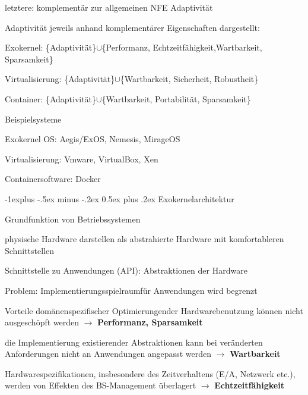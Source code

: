 \documentclass[a4paper]{article}
\makeatletter
\renewcommand{\subsection}{\@startsection{subsection}{2}{0mm}%
 {-1explus -.5ex minus -.2ex}%
 {0.5ex plus .2ex}%
 {\normalfont\normalsize\bfseries}}
\makeatother
\begin{document}
\begin{multicols}{3}
\begin{itemize*}
\begin{itemize*}
            \item letztere: komplementär zur allgemeinen NFE Adaptivität
        \end{itemize*}
        \item Adaptivität jeweils anhand komplementärer Eigenschaften dargestellt:
        \begin{itemize*}
            \item Exokernel: \{Adaptivität\}$\cup$\{Performanz, Echtzeitfähigkeit,Wartbarkeit, Sparsamkeit\}
            \item Virtualisierung: \{Adaptivität\}$\cup$\{Wartbarkeit, Sicherheit, Robustheit\}
            \item Container: \{Adaptivität\}$\cup$\{Wartbarkeit, Portabilität, Sparsamkeit\}
        \end{itemize*}
        \item Beispielsysteme
        \begin{itemize*}
            \item Exokernel OS: Aegis/ExOS, Nemesis, MirageOS
            \item Virtualisierung: Vmware, VirtualBox, Xen
            \item Containersoftware: Docker
        \end{itemize*}
    \end{itemize*}

    \subsection{Exokernelarchitektur}
    \begin{itemize*}
        \item Grundfunktion von Betriebssystemen
        \begin{itemize*}
            \item physische Hardware darstellen als abstrahierte Hardware mit komfortableren Schnittstellen
            \item Schnittstelle zu Anwendungen (API): Abstraktionen der Hardware
        \end{itemize*}
        \item Problem: Implementierungsspielraumfür Anwendungen wird begrenzt
        \begin{enumerate*}
            \item Vorteile domänenspezifischer Optimierungender Hardwarebenutzung können nicht ausgeschöpft werden $\rightarrow$ \textbf{Performanz, Sparsamkeit}
            \item die Implementierung existierender Abstraktionen kann bei veränderten Anforderungen nicht an Anwendungen angepasst werden $\rightarrow$ \textbf{Wartbarkeit}
            \item Hardwarespezifikationen, insbesondere des Zeitverhaltens (E/A, Netzwerk etc.), werden von Effekten des BS-Management überlagert $\rightarrow$ \textbf{Echtzeitfähigkeit}
        \end{enumerate*}
    \end{itemize*}



\end{multicols}
\end{document}
